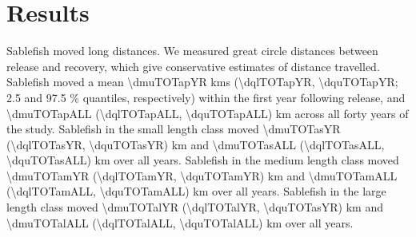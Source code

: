 \documentclass{article}
\begin{document}
\section{Results}
Sablefish moved long distances. We measured great circle distances between release and recovery, which give conservative estimates of distance travelled. Sablefish moved a mean \num{\dmuTOTapYR} kms (\num{\dqlTOTapYR}, \num{\dquTOTapYR}; \num{2.5} and \num{97.5} \% quantiles, respectively) within the first year following release, and  \num{\dmuTOTapALL} (\num{\dqlTOTapALL}, \num{\dquTOTapALL}) km across all forty years of the study. Sablefish in the small length class moved \num{\dmuTOTasYR} (\num{\dqlTOTasYR}, \num{\dquTOTasYR}) km and \num{\dmuTOTasALL} (\num{\dqlTOTasALL}, \num{\dquTOTasALL}) km over all years. Sablefish in the medium length class moved \num{\dmuTOTamYR} (\num{\dqlTOTamYR}, \num{\dquTOTamYR}) km and \num{\dmuTOTamALL} (\num{\dqlTOTamALL}, \num{\dquTOTamALL}) km over all years. Sablefish in the large length class moved \num{\dmuTOTalYR} (\num{\dqlTOTalYR}, \num{\dquTOTasYR}) km and \num{\dmuTOTalALL} (\num{\dqlTOTalALL}, \num{\dquTOTalALL}) km over all years.

\end{document}
